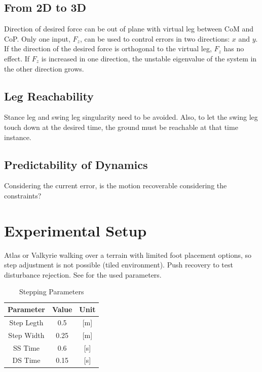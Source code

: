 \subsection{From 2D to 3D}
Direction of desired force can be out of plane with virtual leg between \ac{CoM} and \ac{CoP}. Only one input, $F_z$, can be used to control errors in two directions: $x$ and $y$. If the direction of the desired force is orthogonal to the virtual leg, $F_z$ has no effect. If $F_z$ is increased in one direction, the unstable eigenvalue of the system in the other direction grows. 
\subsection{Leg Reachability}
Stance leg and swing leg singularity need to be avoided. Also, to let the swing leg touch down at the desired time, the ground must be reachable at that time instance. 
\subsection{Predictability of Dynamics}
Considering the current error, is the motion recoverable considering the constraints?
\section{Experimental Setup}
Atlas or Valkyrie walking over a terrain with limited foot placement options, so step adjustment is not possible (tiled environment). Push recovery to test disturbance rejection. See  for the used parameters.
\begin{table}[ht]
\caption{Stepping Parameters} %
\centering %
\begin{tabular}{c c c } %
\hline\hline %
Parameter & Value & Unit \\
\hline %
Step Legth & 0.5 &  [m]\\
Step Width & 0.25 & [m]\\
\acs{SS} Time & 0.6 & [s]\\
\acs{DS} Time & 0.15 & [s]\\
\hline %
\end{tabular}
\label{tab:stepping} %
\end{table}

